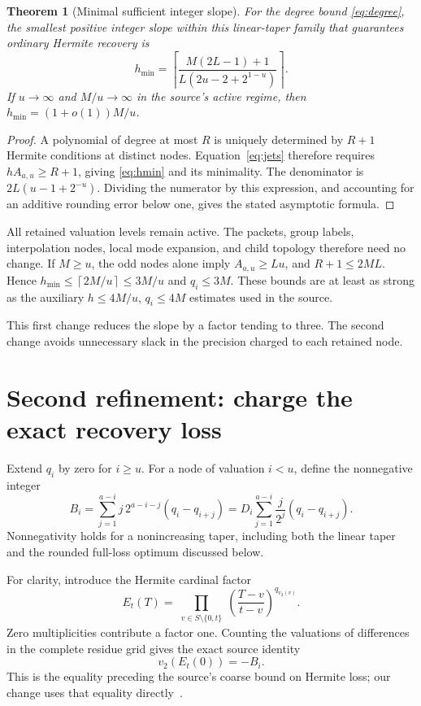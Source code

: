 \documentclass[11pt,letterpaper]{article}
\numberwithin{equation}{section}
\newtheorem{theorem}{Theorem}[section]
\theoremstyle{definition}
\theoremstyle{remark}
\newcommand{\vTwo}{v_2}
\newcommand{\ceil}[1]{\left\lceil #1\right\rceil}
\begin{document}
\begin{theorem}[Minimal sufficient integer slope]
\label{thm:linear}
For the degree bound \eqref{eq:degree}, the smallest positive integer slope
within this linear-taper family that guarantees ordinary Hermite recovery is
\begin{equation}
 \boxed{h_{\min}=\ceil{\frac{M(2L-1)+1}{L(2u-2+2^{1-u})}}.}
 \label{eq:hmin}
\end{equation}
If $u\to\infty$ and $M/u\to\infty$ in the source's active regime, then
$h_{\min}=(1+o(1))M/u$.
\end{theorem}
\begin{proof}
A polynomial of degree at most $R$ is uniquely determined by $R+1$
Hermite conditions at distinct nodes. Equation~\eqref{eq:jets} therefore
requires $hA_{a,u}\ge R+1$, giving \eqref{eq:hmin} and its minimality.
The denominator is $2L(u-1+2^{-u})$. Dividing the numerator by this
expression, and accounting for an additive rounding error below one,
gives the stated asymptotic formula.
\end{proof}

All retained valuation levels remain active. The packets, group labels,
interpolation nodes, local mode expansion, and child topology therefore need
no change. If $M\ge u$, the odd nodes alone imply $A_{a,u}\ge Lu$, and
$R+1\le2ML$. Hence $h_{\min}\le\ceil{2M/u}\le3M/u$ and
$q_i\le3M$. These bounds are at least as strong as the auxiliary
$h\le4M/u$, $q_i\le4M$ estimates used in the source.

This first change reduces the slope by a factor tending to three.
The second change avoids unnecessary slack in the precision charged to
each retained node.

\section{Second refinement: charge the exact recovery loss}
\label{sec:precision}

Extend $q_i$ by zero for $i\ge u$. For a node of valuation $i<u$, define
the nonnegative integer
\begin{equation}
 B_i=\sum_{j=1}^{a-i}j\,2^{a-i-j}(q_i-q_{i+j})
    =D_i\sum_{j=1}^{a-i}\frac{j}{2^j}(q_i-q_{i+j}).
 \label{eq:Bi}
\end{equation}
Nonnegativity holds for a nonincreasing taper, including both the linear
taper and the rounded full-loss optimum discussed below.

For clarity, introduce the Hermite cardinal factor
\[
 E_t(T)=\prod_{\substack{v\in S\setminus\{0,t\}}}
             \left(\frac{T-v}{t-v}\right)^{q_{\vTwo(v)}}.
\]
Zero multiplicities contribute a factor one. Counting the valuations of
differences in the complete residue grid gives the exact source identity
\begin{equation}
 \vTwo(E_t(0))=-B_i.\label{eq:E-valuation}
\end{equation}
This is the equality preceding the source's coarse bound on Hermite loss;
our change uses that equality directly~\cite{contraction}.
\end{document}
